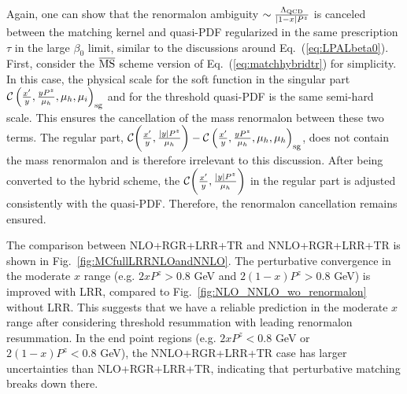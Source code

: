 \documentclass[a4paper,11pt]{article}
\begin{document}
Again, one can show that the renormalon ambiguity $\sim \frac{\Lambda_{\rm QCD}}{|1-x|P^z}$ is canceled between the matching kernel and quasi-PDF regularized in the same prescription $\tau$ in the large $\beta_0$ limit, similar to the discussions around Eq.~(\ref{eq:LPALbeta0}). First, consider the $\overline{\rm MS}$ scheme version of Eq.~(\ref{eq:matchhybridtr}) for simplicity. In this case, the physical scale for the soft function in the singular part ${\cal C}\left(\frac{x'}{y},\frac{y P^z}{\mu_h},\mu_h,\mu_i\right)_{\rm sg}$ and for the threshold quasi-PDF is the same semi-hard scale. This ensures the cancellation of the mass renormalon between these two terms. The regular part, ${\cal C}\bigg(\frac{x'}{y},\frac{|y| P^z}{\mu_h}\bigg) - {\cal C}\left(\frac{x'}{y},\frac{y P^z}{\mu_h},\mu_h,\mu_h\right)_{\rm sg}$, does not contain the mass renormalon and is therefore irrelevant to this discussion. After being converted to the hybrid scheme, the ${\cal C}\bigg(\frac{x'}{y},\frac{|y| P^z}{\mu_h}\bigg)$ in the regular part is adjusted consistently with the quasi-PDF. Therefore, the renormalon cancellation remains ensured.

The comparison between NLO+RGR+LRR+TR and NNLO+RGR+LRR+TR is shown in Fig.~\ref{fig:MCfullLRRNLOandNNLO}. The perturbative convergence in the moderate $x$ range (e.g. $2 x P^z > 0.8$ GeV and $2(1-x)P^z > 0.8$ GeV) is improved with LRR, compared to Fig.~\ref{fig:NLO_NNLO_wo_renormalon} without LRR. This suggests that we have a reliable prediction in the moderate $x$ range after considering threshold resummation with leading renormalon resummation. In the end point regions (e.g. $2 x P^z < 0.8$ GeV or $2(1-x)P^z < 0.8$ GeV), the NNLO+RGR+LRR+TR case has larger uncertainties than NLO+RGR+LRR+TR, indicating that perturbative matching breaks down there.

\end{document}
